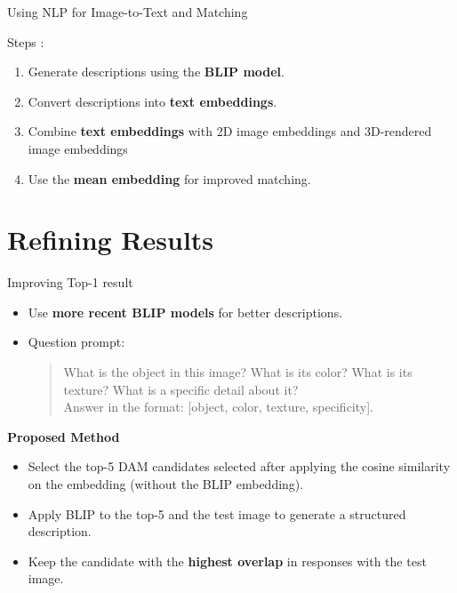 \documentclass{beamer}
\begin{document}
\begin{frame}{Using NLP for Image-to-Text and Matching}

Steps : 
    \vspace{0.5cm} %
    \begin{enumerate}
        \item Generate descriptions using the \textbf{BLIP model}.
        \item Convert descriptions into \textbf{text embeddings}.
        \item Combine \textbf{text embeddings} with 2D image embeddings and 3D-rendered image embeddings
        \item Use the \textbf{mean embedding} for improved matching.
    \end{enumerate}
\end{frame}

\section{Refining Results}
\begin{frame}{Improving Top-1 result}
    \begin{itemize}
        \item Use \textbf{more recent BLIP models} for better descriptions.
        \item Question prompt:
            \begin{quote}
                What is the object in this image? What is its color? What is its texture? What is a specific detail about it? \\
                Answer in the format: [object, color, texture, specificity].
            \end{quote}
        \end{itemize}

    \vspace{0.5cm}
    \textbf{Proposed Method}
    \begin{itemize}
        \item Select the top-5 DAM candidates selected after applying the cosine similarity on the embedding (without the BLIP embedding). 
        \item Apply BLIP to the top-5 and the test image to generate a structured description.
        \item Keep the candidate with the \textbf{highest overlap} in responses with the test image.
        \end{itemize}
\end{frame}
\end{document}
